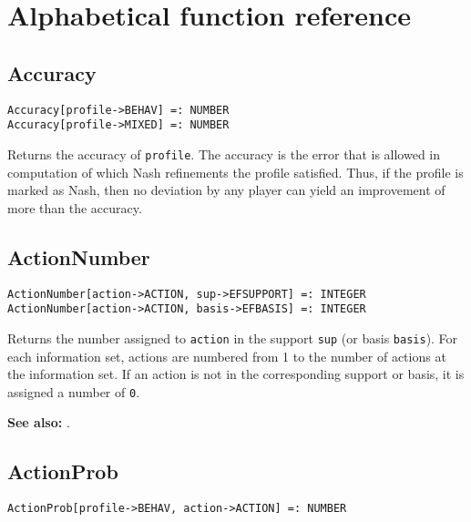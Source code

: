%
%
%

\chapter{Alphabetical function reference}


\section*{Accuracy}\label{PrimAccuracy}
\begin{verbatim}
Accuracy[profile->BEHAV] =: NUMBER
Accuracy[profile->MIXED] =: NUMBER
\end{verbatim}

Returns the accuracy of \verb+profile+.  The accuracy is the error
that is allowed in computation of which Nash refinements the profile
satisfied.  Thus, if the profile is marked as Nash, then no deviation
by any player can yield an improvement of more than the accuracy.  


\section*{ActionNumber}\label{PrimActionNumber}
\begin{verbatim}
ActionNumber[action->ACTION, sup->EFSUPPORT] =: INTEGER 
ActionNumber[action->ACTION, basis->EFBASIS] =: INTEGER
\end{verbatim}

Returns the number assigned to \verb+action+ in the support \verb+sup+
(or basis \verb+basis+).  For each information set, actions are
numbered from 1 to the number of actions at the information set.  If
an action is not in the corresponding support or basis, it is assigned
a number of \verb+0+.

\textbf{See also:} .


\section*{ActionProb}\label{PrimActionProb}
\begin{verbatim}
ActionProb[profile->BEHAV, action->ACTION] =: NUMBER 
\end{verbatim}

